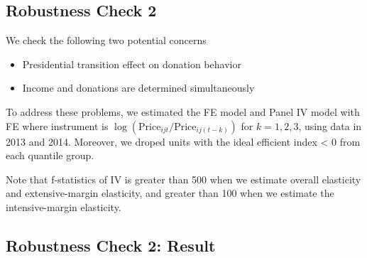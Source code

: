 \documentclass[ review  , 3p ]{elsarticle}
\providecommand{\tightlist}{%
  \setlength{\itemsep}{0pt}\setlength{\parskip}{0pt}}
\begin{document}
  \hypertarget{robustness-check-2-1}{%
  \subsection{Robustness Check 2}\label{robustness-check-2-1}}

  We check the following two potential concerns

  \begin{itemize}
  \tightlist
  \item
    Presidential transition effect on donation behavior
  \item
    Income and donations are determined simultaneously
  \end{itemize}

  To address these problems, we estimated the FE model and Panel IV model with FE where instrument is \(\log(\text{Price}_{ijt}/\text{Price}_{ij(t-k)})\) for \(k = 1, 2, 3\), using data in 2013 and 2014.
  Moreover, we droped units with the ideal efficient index \textless{} 0 from each quantile group.

  Note that f-statistics of IV is greater than 500 when we estimate overall elasticity and extensive-margin elasticity, and greater than 100 when we estimate the intensive-margin elasticity.

  \hypertarget{robustness-check-2-result-1}{%
  \subsection{Robustness Check 2: Result}\label{robustness-check-2-result-1}}
\end{document}
